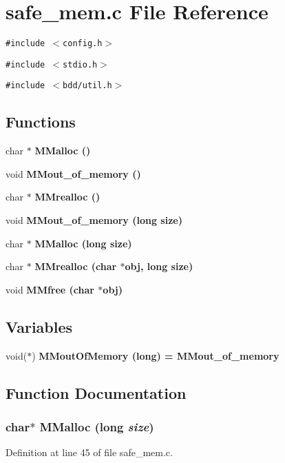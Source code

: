 \section{safe\_\-mem.c File Reference}
\label{safe__mem_8c}
{\tt \#include $<$config.h$>$}\par
{\tt \#include $<$stdio.h$>$}\par
{\tt \#include $<$bdd/util.h$>$}\par
\subsection*{Functions}
\begin{CompactItemize}
\item 
char $\ast$ \bf{MMalloc} ()
\item 
void \bf{MMout\_\-of\_\-memory} ()
\item 
char $\ast$ \bf{MMrealloc} ()
\item 
void \bf{MMout\_\-of\_\-memory} (long \bf{size})
\item 
char $\ast$ \bf{MMalloc} (long \bf{size})
\item 
char $\ast$ \bf{MMrealloc} (char $\ast$obj, long \bf{size})
\item 
void \bf{MMfree} (char $\ast$obj)
\end{CompactItemize}
\subsection*{Variables}
\begin{CompactItemize}
\item 
void($\ast$) \bf{MMout\-Of\-Memory} (long) = MMout\_\-of\_\-memory
\end{CompactItemize}


\subsection{Function Documentation}
\subsubsection{\setlength{\rightskip}{0pt plus 5cm}char$\ast$ MMalloc (long {\em size})}\label{safe__mem_8c_a29b689ece2c0535215f8c6a4f0e4b2e}




Definition at line 45 of file safe\_\-mem.c.

